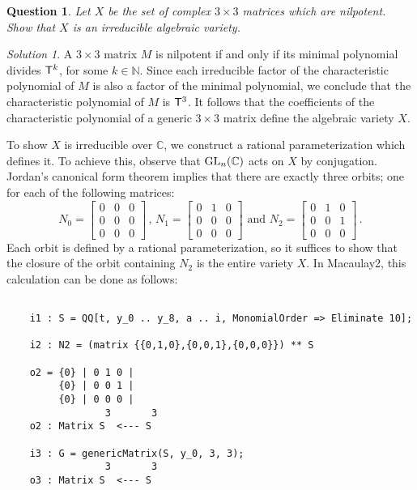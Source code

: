 \documentclass[12pt,noamsfonts]{amsart}
\def\NN{{\mathbb N}}
\def\CC{{\mathbb C}}
\newtheorem{question}{Question}
\theoremstyle{definition}
\theoremstyle{remark}
\newtheorem*{solution}{Solution}
\begin{document}
\begin{question} 
Let $X$ be the set of complex $3 \times 3$ matrices which are
nilpotent.  Show that $X$ is an irreducible algebraic variety.
\end{question}

\begin{solution}
A $3 \times 3$ matrix $M$ is nilpotent if and only if its minimal
polynomial divides ${\sf T}^{k}$, for some $k \in \NN$.  Since each
irreducible factor of the characteristic polynomial of $M$ is also a
factor of the minimal polynomial, we conclude that the characteristic
polynomial of $M$ is ${\sf T}^{3}$.  It follows that the coefficients of the
characteristic polynomial of a generic $3 \times 3$ matrix define the
algebraic variety $X$.

To show $X$ is irreducible over $\CC$, we construct a rational parameterization
which defines it.  To achieve this, observe that ${\rm GL}_{n}(\CC)$
acts on $X$ by conjugation.  Jordan's canonical form theorem
implies that there are exactly three orbits; one for each of
the following matrices:
\[
N_{0} = \begin{bmatrix} 0 & 0 & 0 \\ 0 & 0 & 0 \\ 0 & 0 & 0 \end{bmatrix} 
\, , \, 
N_{1} = \begin{bmatrix} 0 & 1 & 0 \\ 0 & 0 & 0 \\ 0 & 0 & 0 \end{bmatrix}
\text{ and }
N_{2} = \begin{bmatrix} 0 & 1 & 0 \\ 0 & 0 & 1 \\ 0 & 0 & 0 \end{bmatrix}
\, . 
\]
Each orbit is defined by a rational parameterization, so it suffices
to show that the closure of the orbit containing $N_{2}$ is the
entire variety $X$.  In {\sc Macaulay2}, this calculation can be done
as follows: 
{\scriptsize
\begin{verbatim}

    i1 : S = QQ[t, y_0 .. y_8, a .. i, MonomialOrder => Eliminate 10];
    
    i2 : N2 = (matrix {{0,1,0},{0,0,1},{0,0,0}}) ** S
    
    o2 = {0} | 0 1 0 |
         {0} | 0 0 1 |
         {0} | 0 0 0 |
                 3       3
    o2 : Matrix S  <--- S
    
    i3 : G = genericMatrix(S, y_0, 3, 3);
                 3       3
    o3 : Matrix S  <--- S


\end{verbatim}}
\end{solution}
\end{document}
